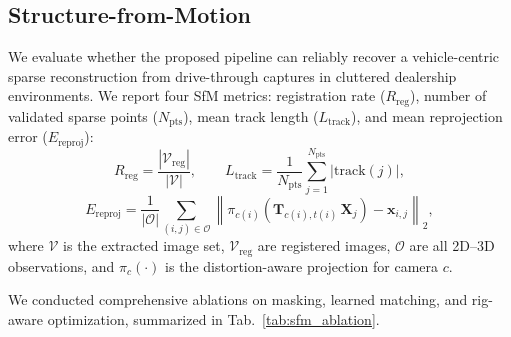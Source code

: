 \documentclass[letterpaper, 10 pt, conference]{ieeeconf}  %
\begin{document}
\subsection{Structure-from-Motion}
\label{subsec:experiments_structure_from_motion}


We evaluate whether the proposed pipeline can reliably recover a vehicle-centric sparse reconstruction from drive-through captures in cluttered dealership environments. We report four SfM metrics: registration rate ($R_{\mathrm{reg}}$), number of validated sparse points ($N_{\mathrm{pts}}$), mean track length ($L_{\mathrm{track}}$), and mean reprojection error ($E_{\mathrm{reproj}}$):
\begin{equation}
R_{\mathrm{reg}}=\frac{|\mathcal{V}_{\mathrm{reg}}|}{|\mathcal{V}|},\qquad
L_{\mathrm{track}}=\frac{1}{N_{\mathrm{pts}}}\sum_{j=1}^{N_{\mathrm{pts}}}|\mathrm{track}(j)|,
\end{equation}
\begin{equation}
E_{\mathrm{reproj}}=\frac{1}{|\mathcal{O}|}\sum_{(i,j)\in\mathcal{O}}
\left\|\pi_{c(i)}\!\left(\mathbf{T}_{c(i),t(i)}\,\mathbf{X}_j\right)-\mathbf{x}_{i,j}\right\|_2,
\end{equation}
where $\mathcal{V}$ is the extracted image set, $\mathcal{V}_{\mathrm{reg}}$ are registered images, $\mathcal{O}$ are all 2D--3D observations, and $\pi_{c}(\cdot)$ is the distortion-aware projection for camera $c$.

We conducted comprehensive ablations on masking, learned matching, and rig-aware optimization, summarized in Tab.~\ref{tab:sfm_ablation}. 
\end{document}
